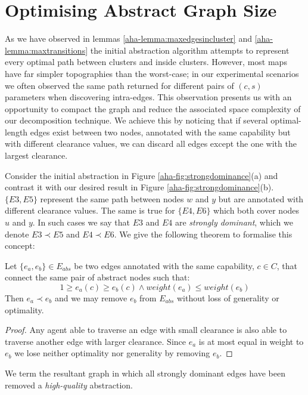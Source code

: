 \section{Optimising Abstract Graph Size}
\par \indent
As we have observed in lemmas \ref{aha-lemma:maxedgesincluster} and \ref{aha-lemma:maxtransitions} the initial abstraction algorithm attempts to represent every optimal path between clusters and inside clusters.
However, most maps have far simpler topographies than the worst-case; in our  experimental scenarios we often observed the same path returned for different pairs of $(c, s)$ parameters when discovering intra-edges.
This observation presents us with an opportunity to compact the graph and reduce the associated space complexity of our decomposition technique. 
We achieve this by noticing that if several optimal-length edges exist between two nodes, annotated with the same capability but with different clearance values, we can discard all edges except the one with the largest clearance. 
\par \indent
Consider the initial abstraction in Figure \ref{aha-fig:strongdominance}(a) and contrast it with our desired result in Figure \ref{aha-fig:strongdominance}(b). $\lbrace E3, E5 \rbrace$ represent the same path between nodes $w$ and $y$ but are annotated with different clearance values. 
The same is true  for $\lbrace E4, E6 \rbrace$ which both cover nodes $u$ and $y$. In such cases we say that $E3$ and $E4$ are \emph{strongly dominant}, which we denote $E3 \prec E5$ and $E4 \prec E6$. We give the following theorem to formalise this concept:

\begin{theorem}
\label{aha-definition:strongdominance}
Let $\lbrace e_{a}, e_{b} \rbrace \in E_{abs}$ be two edges annotated with the same capability, $c \in C$, that connect the same pair of abstract nodes such that:
$$ 1 \geq e_{a}(c) \geq e_{b}(c) \wedge weight(e_{a}) \leq weight(e_{b})$$
Then $e_{a} \prec e_{b}$ and we may remove $e_{b}$ from $E_{abs}$ without loss of generality or optimality.
\end{theorem}
\begin{proof}
Any agent able to traverse an edge with small clearance is also able to traverse another edge with larger clearance. 
Since $e_{a}$ is at most equal in weight to $e_{b}$ we lose neither optimality nor generality by removing $e_{b}$.
\end{proof}
We term the resultant graph in which all strongly dominant edges have been removed a \emph{high-quality} abstraction.  

